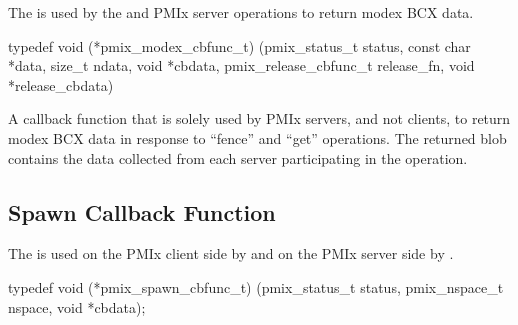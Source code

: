 \summary

The  is used by the  and  PMIx server operations to return modex \ac{BCX} data.

\cspecificstart
\begin{codepar}
typedef void (*pmix_modex_cbfunc_t)
    (pmix_status_t status,
     const char *data, size_t ndata,
     void *cbdata,
     pmix_release_cbfunc_t release_fn,
     void *release_cbdata)
\end{codepar}
\cspecificend

\begin{arglist}
\end{arglist}

\descr

A callback function that is solely used by PMIx servers, and not clients, to return modex \ac{BCX} data in response to ``fence'' and ``get'' operations.
The returned blob contains the data collected from each server participating in the operation.



\subsection{Spawn Callback Function}

\summary

The  is used on the PMIx client side by  and on the PMIx server side by .

\cspecificstart
\begin{codepar}
typedef void (*pmix_spawn_cbfunc_t)
    (pmix_status_t status,
     pmix_nspace_t nspace, void *cbdata);
\end{codepar}
\cspecificend

\begin{arglist}
\end{arglist}


